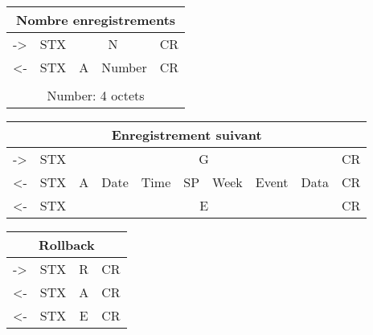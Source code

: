         
\begin{table}[h]
\begin{center}
    \begin{tabular}{|c|c|c|c|c|}
    \hline
    \multicolumn{5}{|c|}{Nombre enregistrements} \\
    \hline
    -> & STX & \multicolumn{2}{c|}{N} & CR \\
    \hline
    <- & STX & A & Number & CR \\
    \hline
    \multicolumn{5}{|c|}{} \\
    \hline
    \multicolumn{5}{|c|}{Number: 4 octets } \\
    \hline
    \end{tabular} 
\end{center}
\end{table}


\begin{table}[h]
\begin{center}
    \begin{tabular}{|c|c|c|c|c|c|c|c|c|c|}
    \hline
    \multicolumn{10}{|c|}{Enregistrement suivant} \\
    \hline
    -> & STX & \multicolumn{7}{c|}{G} & CR \\
    \hline
    <- & STX & A & Date & Time & SP & Week & Event & Data & CR \\
    \hline
    <- & STX & \multicolumn{7}{c|}{E} & CR \\
    \hline
    \end{tabular} 
\end{center}
\end{table}


\begin{table}[h]
\begin{center}
    \begin{tabular}{|c|c|c|c|}
    \hline
    \multicolumn{4}{|c|}{Rollback} \\
    \hline
    -> & STX & R & CR \\
    \hline
    <- & STX & A & CR \\
    \hline
    <- & STX & E & CR \\
    \hline
    \end{tabular} 
\end{center}
\end{table}


